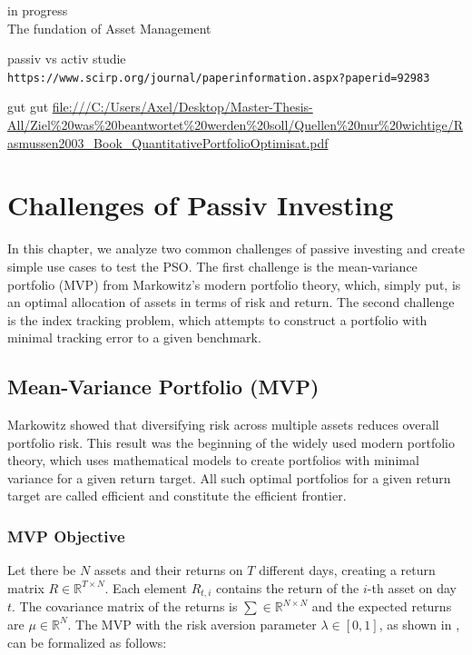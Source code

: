 \documentclass[
  oneside]{book}
\begin{document}
\textbar\textbar\textbar in progress\textbar\textbar\textbar{}\\
The fundation of Asset Management

passiv vs activ studie
\texttt{https://www.scirp.org/journal/paperinformation.aspx?paperid=92983}

gut gut
\url{file:///C:/Users/Axel/Desktop/Master-Thesis-All/Ziel\%20was\%20beantwortet\%20werden\%20soll/Quellen\%20nur\%20wichtige/Rasmussen2003_Book_QuantitativePortfolioOptimisat.pdf}

\hypertarget{challenges}{%
\chapter{Challenges of Passiv Investing}\label{challenges}}

In this chapter, we analyze two common challenges of passive investing and create simple use cases to test the PSO. The first challenge is the mean-variance portfolio (MVP) from Markowitz's modern portfolio theory, which, simply put, is an optimal allocation of assets in terms of risk and return. The second challenge is the index tracking problem, which attempts to construct a portfolio with minimal tracking error to a given benchmark.

\hypertarget{mean-variance-portfolio-mvp}{%
\section{Mean-Variance Portfolio (MVP)}\label{mean-variance-portfolio-mvp}}

Markowitz showed that diversifying risk across multiple assets reduces overall portfolio risk. This result was the beginning of the widely used modern portfolio theory, which uses mathematical models to create portfolios with minimal variance for a given return target. All such optimal portfolios for a given return target are called efficient and constitute the efficient frontier.

\hypertarget{mvp-objective}{%
\subsection{MVP Objective}\label{mvp-objective}}

Let there be \(N\) assets and their returns on \(T\) different days, creating a return matrix \(R \in \mathbb{R}^{T \times N}\). Each element \(R_{t,i}\) contains the return of the \(i\)-th asset on day \(t\). The covariance matrix of the returns is \(\textstyle\sum \in \mathbb{R}^{N \times N}\) and the expected returns are \(\mu \in \mathbb{R}^{N}\). The MVP with the risk aversion parameter \(\lambda \in [0,1]\), as shown in \citep{Mari2005}, can be formalized as follows:
\end{document}
